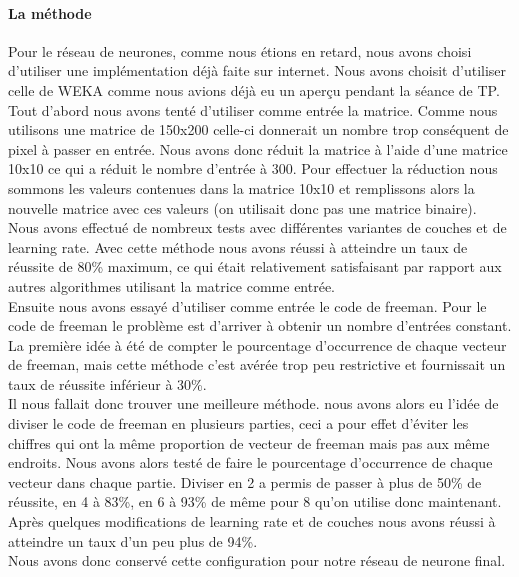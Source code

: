 \documentclass[10pt,a4paper]{report}
\begin{document}
\paragraph{La méthode}
\begin{flushleft}
Pour le réseau de neurones, comme nous étions en retard, nous avons choisi d'utiliser une implémentation déjà faite sur internet. Nous avons choisit d'utiliser celle de WEKA comme nous avions déjà eu un aperçu pendant la séance de TP.\\
\vspace*{0.3cm}
Tout d'abord nous avons tenté d'utiliser comme entrée la matrice. Comme nous utilisons une matrice de 150x200 celle-ci donnerait un nombre trop conséquent de pixel à passer en entrée. Nous avons donc réduit la matrice à l'aide d'une matrice 10x10 ce qui a réduit le nombre d'entrée à 300. Pour effectuer la réduction nous sommons les valeurs contenues dans la matrice 10x10 et remplissons alors la nouvelle matrice avec ces valeurs (on utilisait donc pas une matrice binaire).\\
Nous avons effectué de nombreux tests avec différentes variantes de couches et de learning rate. Avec cette méthode nous avons réussi à atteindre un taux de réussite de 80\% maximum, ce qui était relativement satisfaisant par rapport aux autres algorithmes utilisant la matrice comme entrée.\\
\vspace*{0.3cm}
Ensuite nous avons essayé d'utiliser comme entrée le code de freeman. Pour le code de freeman le problème est d'arriver à obtenir un nombre d'entrées constant. La première idée à été de compter le pourcentage d'occurrence de chaque vecteur de freeman, mais cette méthode c'est avérée trop peu restrictive et fournissait un taux de réussite inférieur à 30\%.\\
Il nous fallait donc trouver une meilleure méthode. nous avons alors eu l'idée de diviser le code de freeman en plusieurs parties, ceci a pour effet d'éviter les chiffres qui ont la même proportion de vecteur de freeman mais pas aux même endroits. Nous avons alors testé de faire le pourcentage d'occurrence de chaque vecteur dans chaque partie. Diviser en 2 a permis de passer à plus de 50\% de réussite, en 4 à 83\%, en 6 à 93\% de même pour 8 qu'on utilise donc maintenant. Après quelques modifications de learning rate et de couches nous avons réussi à atteindre un taux d'un peu plus de 94\%.\\
Nous avons donc conservé cette configuration pour notre réseau de neurone final.
\end{flushleft}
\end{document}
